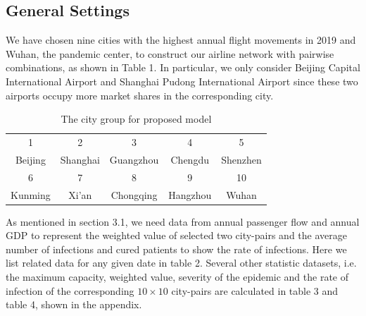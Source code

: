 \documentclass[11pt,twocolumn]{article}
\begin{document}
\subsection{General Settings}
We have chosen nine cities with the highest annual flight movements in 2019 and Wuhan, the pandemic center, to construct our airline network with pairwise combinations, as shown in Table 1. In particular, we only consider Beijing Capital International Airport and Shanghai Pudong International Airport since these two airports occupy more market shares in the corresponding city. 
\begin{table}[H]
    \centering
    \caption{The city group for proposed model}
    \setlength{\tabcolsep}{1pt}
    \begin{tabular}{ccccc}
        \toprule
         1 & 2 & 3 & 4 & 5 \\
         Beijing & Shanghai & Guangzhou & Chengdu & Shenzhen \\
        \toprule
        6 & 7 & 8 & 9 & 10 \\
        Kunming & Xi'an & Chongqing & Hangzhou & Wuhan \\
        \bottomrule
    \end{tabular}
    \label{table1}
\end{table}
As mentioned in section 3.1, we need data from annual passenger flow and annual GDP to represent the weighted value of selected two city-pairs and the average number of infections and cured patients to show the rate of infections. Here we list related data for any given date in table 2. Several other statistic datasets, i.e. the maximum capacity, weighted value, severity of the epidemic and the rate of infection of the corresponding $10\times 10$ city-pairs are calculated in table 3 and table 4, shown in the appendix.
\end{document}
